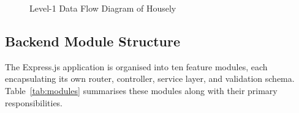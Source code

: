 \documentclass[12pt,a4paper]{report}
\begin{document}
\begin{figure}[H]
\centering
\caption{Level-1 Data Flow Diagram of Housely}
\label{fig:dfd}
\end{figure}

\subsection{Backend Module Structure}

The Express.js application is organised into ten feature modules, each encapsulating its
own router, controller, service layer, and validation schema. Table~\ref{tab:modules}
summarises these modules along with their primary responsibilities.
\end{document}
